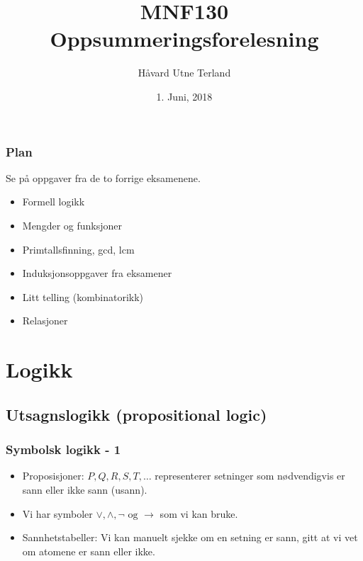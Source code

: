 \documentclass{beamer}
\title[MNF130 Oppsummering]{MNF130 Oppsummeringsforelesning}
\author{Håvard Utne Terland}
\institute[UiB]
{
	Universitetet i Bergen \\
	\medskip
\textit{Havard.Terland@student.uib.no}

}
\date{1. Juni, 2018}
\begin{document}
\begin{frame}
	\titlepage
\end{frame}


\begin{frame}
	\frametitle{Plan}
	Se på oppgaver fra de to forrige eksamenene.
	\begin{itemize}
		\item Formell logikk
		\item Mengder og funksjoner
		\item Primtallsfinning, gcd, lcm
		\item Induksjonsoppgaver fra eksamener
		\item Litt telling (kombinatorikk)
		\item Relasjoner
	\end{itemize}
\end{frame}


\section{Logikk}

\subsection{Utsagnslogikk (propositional logic)}

\begin{frame}
	\frametitle{Symbolsk logikk - 1}
	\begin{itemize}
		\item Proposisjoner: $P,Q,R,S,T,\dots$ representerer setninger som nødvendigvis er sann eller ikke sann (usann).
		\item Vi har symboler $\vee,\wedge,\neg \text{ og } \rightarrow$ som vi kan bruke.
		\item Sannhetstabeller: Vi kan manuelt sjekke om en setning er sann, gitt at vi vet om atomene er sann eller ikke.
		 
	\end{itemize}


\end{frame}
\end{document}

